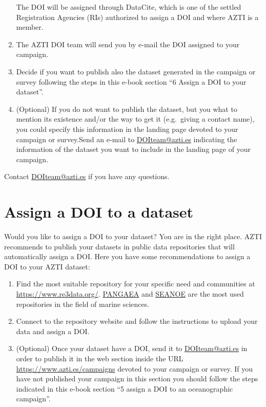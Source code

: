 \documentclass[
]{book}
\begin{document}
\begin{enumerate}
  The DOI will be assigned through DataCite, which is one of the settled Registration Agencies (RIs) authorized to assign a DOI and where AZTI is a member.
\item
  The AZTI DOI team will send you by e-mail the DOI assigned to your campaign.
\item
  Decide if you want to publish also the dataset generated in the campaign or survey following the steps in this e-book section ``6 Assign a DOI to your dataset''.
\item
  (Optional) If you do not want to publish the dataset, but you what to mention its existence and/or the way to get it (e.g.~giving a contact name), you could specify this information in the landing page devoted to your campaign or survey.Send an e-mail to \url{DOIteam@azti.es} indicating the information of the dataset you want to include in the landing page of your campaign.
\end{enumerate}

Contact \url{DOIteam@azti.es} if you have any questions.

\hypertarget{assign-a-doi-to-a-dataset}{%
\chapter{Assign a DOI to a dataset}\label{assign-a-doi-to-a-dataset}}

Would you like to assign a DOI to your dataset? You are in the right place.
AZTI recommends to publish your datasets in public data repositories that will automatically assign a DOI.
Here you have some recommendations to assign a DOI to your AZTI dataset:

\begin{enumerate}
\def\labelenumi{\arabic{enumi}.}
\item
  Find the most suitable repository for your specific need and communities at \url{https://www.re3data.org/}. \href{https://www.pangaea.de/}{PANGAEA} and \href{https://www.seanoe.org/html/publish-your-data.htm}{SEANOE} are the most used repositories in the field of marine sciences.
\item
  Connect to the repository website and follow the instructions to upload your data and assign a DOI.
\item
  (Optional) Once your dataset have a DOI, send it to \url{DOIteam@azti.es} in order to publish it in the web section inside the URL \href{https://www.azti.es/campaigns/}{https://www.azti.es/campaigns} devoted to your campaign or survey. If you have not published your campaign in this section you should follow the steps indicated in this e-book section ``5 assign a DOI to an oceanographic campaign''.
\end{enumerate}
\end{document}
